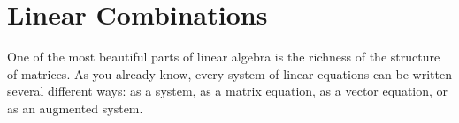 %             
% 
%             
% 
% 
% 
% 

\newpage\section{Linear Combinations}
One of the most beautiful parts of linear algebra is the richness of the structure of
matrices. As you already know, every system of linear equations can be written several
different ways: as a system, as a matrix equation, as a vector equation, or as an
augmented system. 

